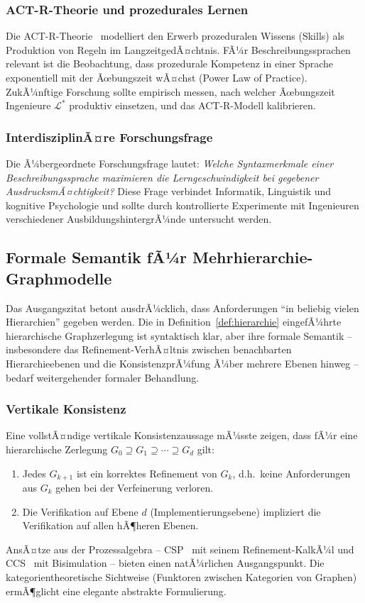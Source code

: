 ﻿\documentclass[a4paper,12pt]{article}
\theoremstyle{definition}
\begin{document}
\subsubsection{ACT-R-Theorie und prozedurales Lernen}

Die ACT-R-Theorie~\cite{anderson1993} modelliert den Erwerb prozeduralen Wissens
(Skills) als Produktion von Regeln im LangzeitgedÃ¤chtnis. FÃ¼r Beschreibungssprachen
relevant ist die Beobachtung, dass prozedurale Kompetenz in einer Sprache exponentiell
mit der Ãœbungszeit wÃ¤chst (Power Law of Practice). ZukÃ¼nftige Forschung sollte
empirisch messen, nach welcher Ãœbungszeit Ingenieure $\mathcal{L}^*$ produktiv
einsetzen, und das ACT-R-Modell kalibrieren.

\subsubsection{InterdisziplinÃ¤re Forschungsfrage}

Die Ã¼bergeordnete Forschungsfrage lautet: \emph{Welche Syntaxmerkmale einer
Beschreibungssprache maximieren die Lerngeschwindigkeit bei gegebener
AusdrucksmÃ¤chtigkeit?} Diese Frage verbindet Informatik, Linguistik und kognitive
Psychologie und sollte durch kontrollierte Experimente mit Ingenieuren verschiedener
AusbildungshintergrÃ¼nde untersucht werden.

\subsection{Formale Semantik fÃ¼r Mehrhierarchie-Graphmodelle}

Das Ausgangszitat betont ausdrÃ¼cklich, dass Anforderungen \enquote{in beliebig vielen
Hierarchien} gegeben werden. Die in Definition~\ref{def:hierarchie} eingefÃ¼hrte
hierarchische Graphzerlegung ist syntaktisch klar, aber ihre formale Semantik --
insbesondere das Refinement-VerhÃ¤ltnis zwischen benachbarten Hierarchieebenen und
die KonsistenzprÃ¼fung Ã¼ber mehrere Ebenen hinweg -- bedarf weitergehender formaler
Behandlung.

\subsubsection{Vertikale Konsistenz}

Eine vollstÃ¤ndige vertikale Konsistenzaussage mÃ¼sste zeigen, dass fÃ¼r eine hierarchische
Zerlegung $G_0 \supseteq G_1 \supseteq \cdots \supseteq G_d$ gilt:
\begin{enumerate}
  \item Jedes $G_{k+1}$ ist ein korrektes Refinement von $G_k$, d.h.\ keine Anforderungen
        aus $G_k$ gehen bei der Verfeinerung verloren.
  \item Die Verifikation auf Ebene $d$ (Implementierungsebene) impliziert die Verifikation
        auf allen hÃ¶heren Ebenen.
\end{enumerate}
AnsÃ¤tze aus der Prozessalgebra -- CSP~\cite{hoare1978} mit seinem Refinement-KalkÃ¼l
und CCS~\cite{milner1980} mit Bisimulation -- bieten einen natÃ¼rlichen Ausgangspunkt.
Die kategorientheoretische Sichtweise (Funktoren zwischen Kategorien von Graphen)
ermÃ¶glicht eine elegante abstrakte Formulierung.
\end{document}
